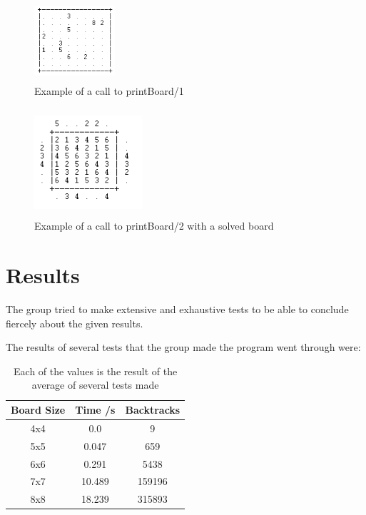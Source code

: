 \documentclass{llncs}
\begin{document}
\begin{figure}[h!]
\begin{center}
\includegraphics[height=3cm,width=3cm]{images/printBoard1.png}
\caption{Example of a call to printBoard/1}
\label{Figure 3}
\end{center}
\end{figure}

\begin{figure}[h!]
\begin{center}
\includegraphics[height=4cm,width=4cm]{images/printBoard21.png}
\caption{Example of a call to printBoard/2 with a solved board}
\label{Figure 4}
\end{center}
\end{figure}

%
\section{Results}

The group tried to make extensive and exhaustive tests to be able to conclude fiercely about the given results.

The results of several tests that the group made the program went through were:

\begin{table}[]
\centering
\caption{Each of the values is the result of the average of several tests made}
\label{Results Tablel}
\begin{tabular}{@{}ccc@{}}
\toprule
\multicolumn{1}{c|}{\textbf{Board Size}} & \multicolumn{1}{c|}{\textbf{Time /s}} & \textbf{Backtracks} \\ \midrule
4x4                                      & 0.0                                 & 9                   \\ \midrule
5x5                                      & 0.047                                 & 659                 \\ \midrule
6x6                                      & 0.291                                 & 5438                \\ \midrule
7x7                                      & 10.489                                & 159196              \\ \midrule
8x8                                      & 18.239                                & 315893              \\ \bottomrule
\end{tabular}
\end{table}
\end{document}
